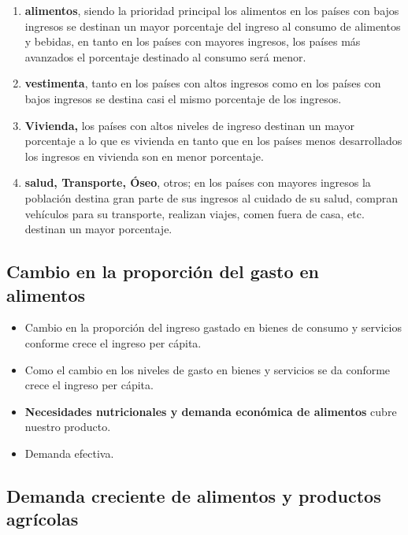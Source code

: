 \documentclass[
  a4paper,
]{article}
\begin{document}
\begin{enumerate}
\def\labelenumi{\arabic{enumi}.}
\item
  \textbf{alimentos}, siendo la prioridad principal los alimentos en los
  países con bajos ingresos se destinan un mayor porcentaje del ingreso
  al consumo de alimentos y bebidas, en tanto en los países con mayores
  ingresos, los países más avanzados el porcentaje destinado al consumo
  será menor.
\item
  \textbf{vestimenta}, tanto en los países con altos ingresos como en
  los países con bajos ingresos se destina casi el mismo porcentaje de
  los ingresos.
\item
  \textbf{Vivienda,} los países con altos niveles de ingreso destinan un
  mayor porcentaje a lo que es vivienda en tanto que en los países menos
  desarrollados los ingresos en vivienda son en menor porcentaje.
\item
  \textbf{salud, Transporte, Óseo}, otros; en los países con mayores
  ingresos la población destina gran parte de sus ingresos al cuidado de
  su salud, compran vehículos para su transporte, realizan viajes, comen
  fuera de casa, etc. destinan un mayor porcentaje.
\end{enumerate}

\hypertarget{cambio-en-la-proporciuxf3n-del-gasto-en-alimentos}{%
\subsection{Cambio en la proporción del gasto en
alimentos}\label{cambio-en-la-proporciuxf3n-del-gasto-en-alimentos}}

\begin{itemize}
\item
  Cambio en la proporción del ingreso gastado en bienes de consumo y
  servicios conforme crece el ingreso per cápita.
\item
  Como el cambio en los niveles de gasto en bienes y servicios se da
  conforme crece el ingreso per cápita.
\item
  \textbf{Necesidades nutricionales y demanda económica de alimentos}
  cubre nuestro producto.
\item
  Demanda efectiva.
\end{itemize}

\hypertarget{demanda-creciente-de-alimentos-y-productos-agruxedcolas}{%
\subsection{Demanda creciente de alimentos y productos
agrícolas}\label{demanda-creciente-de-alimentos-y-productos-agruxedcolas}}
\end{document}
